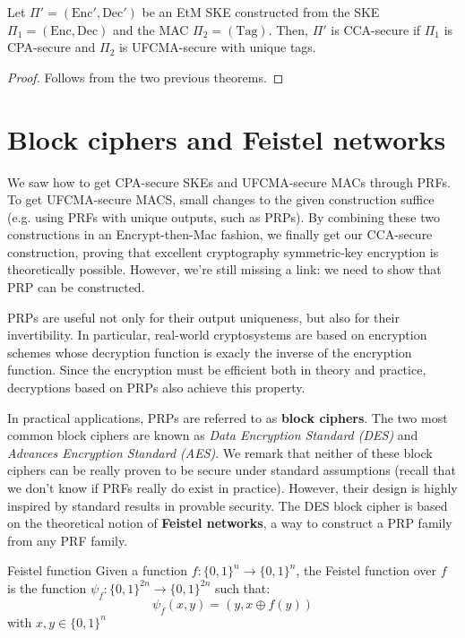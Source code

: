 \documentclass[a4paper, 12pt]{report}
\begin{document}
    \begin{framedcor}{}
        Let $\Pi' = (\mathrm{Enc}', \mathrm{Dec}')$ be an EtM SKE constructed from the SKE $\Pi_1 = (\mathrm{Enc}, \mathrm{Dec})$ and the MAC $\Pi_2 = (\mathrm{Tag})$. Then, $\Pi'$ is CCA-secure if $\Pi_1$ is CPA-secure and $\Pi_2$ is UFCMA-secure with unique tags.
    \end{framedcor}

    \begin{proof}
        Follows from the two previous theorems.
    \end{proof}

    \section{Block ciphers and Feistel networks}

    We saw how to get CPA-secure SKEs and UFCMA-secure MACs through PRFs. To get UFCMA-secure MACS, small changes to the given construction suffice (e.g. using PRFs with unique outputs, such as PRPs). By combining these two constructions in an Encrypt-then-Mac fashion, we finally get our CCA-secure construction, proving that excellent cryptography symmetric-key encryption is theoretically possible. However, we're still missing a link: we need to show that PRP can be constructed.

    PRPs are useful not only for their output uniqueness, but also for their invertibility. In particular, real-world cryptosystems are based on encryption schemes whose decryption function is exacly the inverse of the encryption function. Since the encryption must be efficient both in theory and practice, decryptions based on PRPs also achieve this property.
    
    In practical applications, PRPs are referred to as \textbf{block ciphers}. The two most common block ciphers are known as \textit{Data Encryption Standard (DES)} and \textit{Advances Encryption Standard (AES)}. We remark that neither of these block ciphers can be really proven to be secure under standard assumptions (recall that we don't know if PRFs really do exist in practice). However, their design is highly inspired by standard results in provable security. The DES block cipher is based on the theoretical notion of \textbf{Feistel networks}, a way to construct a PRP family from any PRF family.

    \begin{frameddefn}{Feistel function}
        Given a function $f : \{0,1\}^n \to \{0,1\}^n$, the Feistel function over $f$ is the function $\psi_f : \{0,1\}^{2n} \to \{0,1\}^{2n}$ such that:
        \[\psi_f(x,y) = (y, x \oplus f(y))\]
        with $x,y \in \{0,1\}^n$
    \end{frameddefn}
\end{document}
